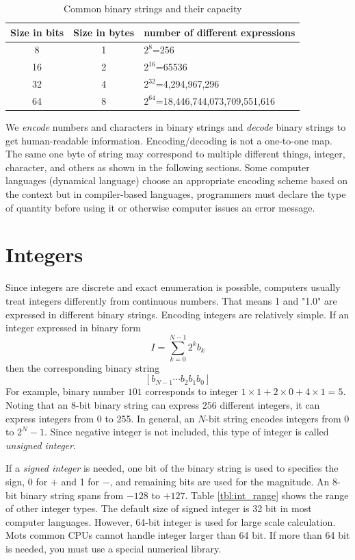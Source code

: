 \begin{table}[tb]
\centering
\caption{Common binary strings and their capacity}\label{tbl:binary-sizes}
\begin{tabular}{ccl}
Size in bits & Size in bytes & number of different expressions\\
\hline
 8  & 1 & $2^8$=256 \\
16  & 2 & $2^{16}$=65536\\
32  & 4 & $2^{32}$=4,294,967,296\\
64  & 8 & $2^{64}$=18,446,744,073,709,551,616\\
\hline
\end{tabular}
\end{table}


We \textit{encode} numbers and characters in binary strings and \textit{decode} binary strings to get human-readable information.  Encoding/decoding is not a one-to-one map.
The same one byte of string may correspond to multiple different things, integer, character, and others as shown in the following sections.  Some computer languages (dynamical language) choose an appropriate encoding scheme based on the context but in compiler-based languages, programmers must declare the type of quantity before using it or otherwise computer issues an error message.


\noindent
\section{Integers}\label{sec:integer}

Since integers are discrete and exact enumeration is possible, computers usually treat integers differently from continuous numbers.  That means 1 and "1.0" are expressed in different binary strings.  Encoding integers are relatively simple. If an integer
expressed in binary form
\[
I = \sum_{k=0}^{N-1} 2^k b_k
\]
then the corresponding binary string 
\[
[b_{N-1} \cdots b_2 b_1 b_0]
\]
For example, binary number $101$ corresponds to integer $1\times 1+ 2 \times 0 + 4 \times 1 =5$.   Noting that an 8-bit binary string can express $256$ different integers, it can express integers from 0 to 255. In general, an $N$-bit string encodes integers from 0 to $2^N-1$.  Since negative integer is not included, this type of integer is called \textit{unsigned integer}.

If a \textit{signed integer} is needed, one bit of the binary string is used to specifies the sign, 0 for $+$ and 1 for $-$, and remaining bits are used for the magnitude. An 8-bit binary string spans from $-128$ to $+127$.  Table \ref{tbl:int_range} shows the range of other integer types.  The default size of signed integer is 32 bit in most computer languages.  However, 64-bit integer is used for large scale calculation.  Mots common CPUs cannot handle integer larger than 64 bit.  If more than 64 bit is needed, you must use a special numerical library.

